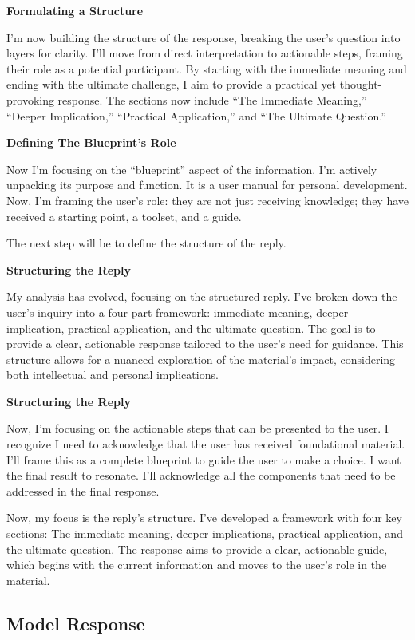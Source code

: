 \documentclass{article}
\begin{document}
\textbf{Formulating a Structure}

I'm now building the structure of the response, breaking the user's question into layers for clarity. I'll move from direct interpretation to actionable steps, framing their role as a potential participant. By starting with the immediate meaning and ending with the ultimate challenge, I aim to provide a practical yet thought-provoking response. The sections now include ``The Immediate Meaning,'' ``Deeper Implication,'' ``Practical Application,'' and ``The Ultimate Question.''

\textbf{Defining The Blueprint's Role}

Now I'm focusing on the ``blueprint'' aspect of the information. I'm actively unpacking its purpose and function. It is a user manual for personal development. Now, I'm framing the user's role: they are not just receiving knowledge; they have received a starting point, a toolset, and a guide.

The next step will be to define the structure of the reply.

\textbf{Structuring the Reply}

My analysis has evolved, focusing on the structured reply. I've broken down the user's inquiry into a four-part framework: immediate meaning, deeper implication, practical application, and the ultimate question. The goal is to provide a clear, actionable response tailored to the user's need for guidance. This structure allows for a nuanced exploration of the material's impact, considering both intellectual and personal implications.

\textbf{Structuring the Reply}

Now, I'm focusing on the actionable steps that can be presented to the user. I recognize I need to acknowledge that the user has received foundational material. I'll frame this as a complete blueprint to guide the user to make a choice. I want the final result to resonate. I'll acknowledge all the components that need to be addressed in the final response.

Now, my focus is the reply's structure. I've developed a framework with four key sections: The immediate meaning, deeper implications, practical application, and the ultimate question. The response aims to provide a clear, actionable guide, which begins with the current information and moves to the user's role in the material.

\subsection*{Model Response}\label{model-response}
\end{document}
